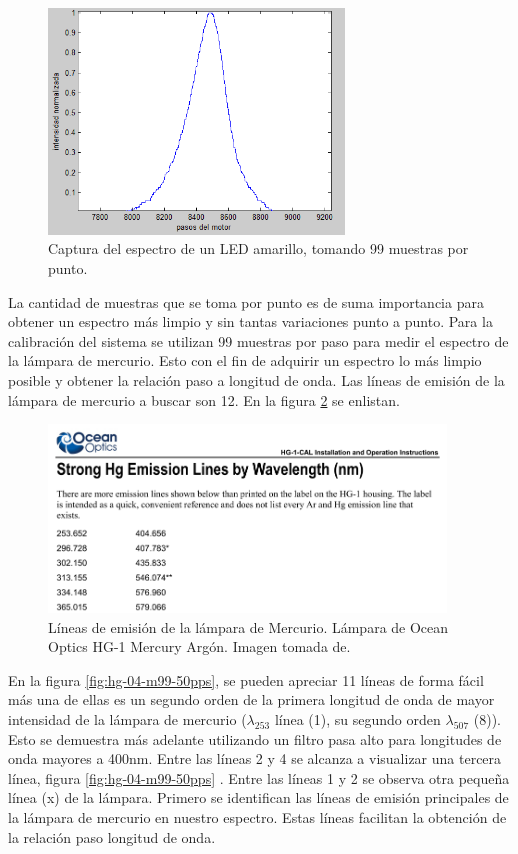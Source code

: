 \begin{figure}[h]
	\centering
	\includegraphics[width=0.9\linewidth,height=6cm]{Imagenes/3/LED99Muestras}
	\caption[Espectro de un LED amarillo.]{Captura del espectro de un LED amarillo, tomando 99 muestras por punto.}
	\label{fig:led99muestras}
\end{figure}

La cantidad de muestras que se toma por punto es de suma importancia para obtener un espectro más limpio y sin tantas variaciones punto a punto.
Para la calibración del sistema se utilizan 99 muestras por paso para medir el espectro de la lámpara de mercurio. Esto con el fin de adquirir un espectro lo más limpio posible y obtener la relación paso a longitud de onda. Las líneas de emisión de la lámpara de mercurio a buscar son 12. En la figura \ref{fig:mercuriolineas} se enlistan.

\begin{figure}[h]
	\centering
	\includegraphics[width=0.8\linewidth,height=5cm]{Imagenes/3/Mercuriolineas}
	\caption{Líneas de emisión de la lámpara de Mercurio. Lámpara de Ocean Optics HG-1 Mercury Argón. Imagen tomada de. \cite{Excel2000}}
	\label{fig:mercuriolineas}
\end{figure}

En la figura \ref{fig:hg-04-m99-50pps}, se pueden apreciar 11 líneas de forma fácil más una de ellas es un segundo orden de la primera longitud de onda de mayor intensidad de la lámpara de mercurio ($\lambda_{253}$ línea (1), su segundo orden $\lambda_{507}$ (8)). Esto se demuestra más adelante utilizando un filtro pasa alto para longitudes de onda mayores a 400nm. Entre las líneas 2 y 4 se alcanza a visualizar una tercera línea, figura \ref{fig:hg-04-m99-50pps} . Entre las líneas 1 y 2 se observa otra pequeña línea (x) de la lámpara. Primero se identifican las líneas de emisión principales de la lámpara de mercurio en nuestro espectro. Estas líneas facilitan la obtención de la relación paso longitud de onda.

